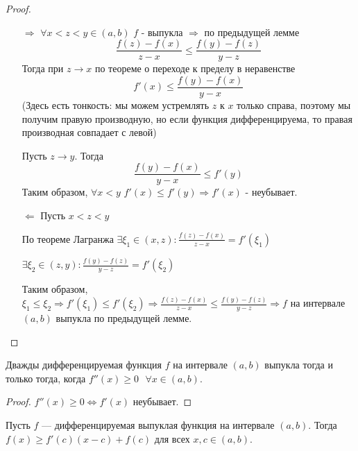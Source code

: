 	\begin{proof}
		\begin{enumerate}
			\item[$\Rightarrow$] $\forall x < z < y \in (a, b)$
			$f$ - выпукла $\Rightarrow$ по предыдущей лемме
			\[ \frac{f(z) - f(x)}{z - x} \leqslant \frac{f(y) - f(z)}{y - z} \]
			Тогда при $z \to x$ по теореме о переходе к пределу в неравенстве
			\[ f'(x) \leqslant \frac{f(y) - f(x)}{y - x} \]
			(Здесь есть тонкость: мы можем устремлять $z$ к $x$ только справа, поэтому мы получим правую производную, но если функция дифференцируема, то правая производная совпадает с левой)
			
			Пусть $z \to y$. Тогда
			\[ \frac{f(y) - f(x)}{y - x} \leqslant f'(y) \]
		    Таким образом, $\forall x < y$ $f'(x) \leqslant f'(y) \Rightarrow f'(x)$ - неубывает. 
			\item[$\Leftarrow$] Пусть $x < z < y$
			
			По теореме Лагранжа $\exists \xi_1 \in (x, z): \frac{f(z) - f(x)}{z - x} = f'(\xi_1)$
			
			$\exists \xi_2 \in (z, y): \frac{f(y) - f(z)}{y - z} = f'(\xi_2)$
			
			Таким образом, $\xi_1 \leqslant \xi_2 \Rightarrow f'(\xi_1) \leqslant f'(\xi_2) \Rightarrow \frac{f(z) - f(x)}{z - x} \leqslant \frac{f(y) - f(z)}{y - z} \Rightarrow f$ на интервале $(a, b)$ выпукла по предыдущей лемме.
		\end{enumerate}
	\end{proof}
	
	\begin{corollary}
		Дважды дифференцируемая функция $f$ на интервале $(a, b)$ выпукла тогда и только тогда, когда $f''(x) \geqslant 0 \text{ } \forall x \in (a, b).$
	\end{corollary}
	
	\begin{proof}
		$f''(x) \geqslant 0 \Leftrightarrow f'(x)$ неубывает. 
	\end{proof}
	
	\begin{corollary}
		Пусть $f$ — дифференцируемая выпуклая функция на интервале $(a, b)$. Тогда $f(x) \geqslant f'(c)(x - c) + f(c)$ для всех $x, c \in (a, b)$.
    \end{corollary}
    

